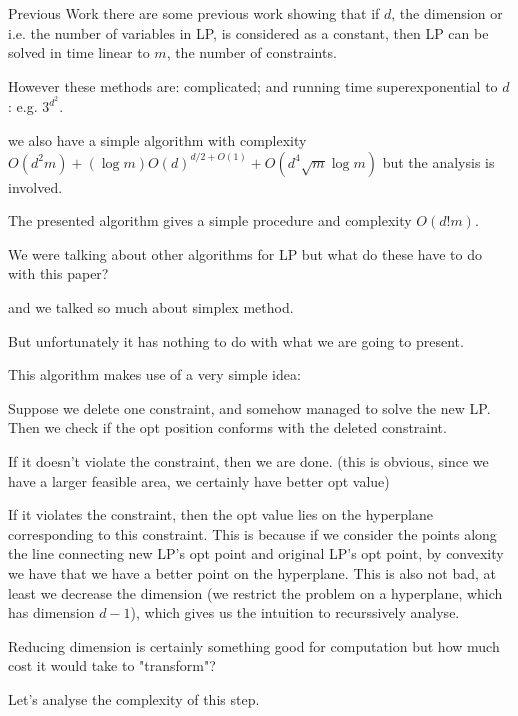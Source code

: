 \documentclass{beamer}
\begin{document}
\begin{frame}{Previous Work}
	there are some previous work showing that
	if $d$, the dimension or i.e. the number of variables in LP, is considered as a constant,
	then LP can be solved in time linear to $m$, the number of constraints.

	However these methods are: complicated; and running time superexponential to $d$: e.g. $3^{d^2}$.

	we also have a simple algorithm with complexity $O(d^2m) + (\log m)O(d)^{d/2 + O(1)} + O(d^4 \sqrt{m} \log m)$
	but the analysis is involved.

	The presented algorithm gives a simple procedure and complexity $O(d!m)$.

\end{frame}

\begin{frame}
	We were talking about other algorithms for LP but what do these have to do with this paper?

	and we talked so much about simplex method.

	But unfortunately it has nothing to do with what we are going to present.

	This algorithm makes use of a very simple idea:

	Suppose we delete one constraint, and somehow managed to solve the new LP.
	Then we check if the opt position conforms with the deleted constraint.

	If it doesn't violate the constraint, then we are done. (this is obvious,
	since we have a larger feasible area, we certainly have better opt value)

	If it violates the constraint, then the opt value lies on the hyperplane
	corresponding to this constraint.
	This is because if we consider the points along the line connecting
	new LP's opt point and original LP's opt point, by convexity we have that
	we have a better point on the hyperplane.
	This is also not bad, at least we decrease the dimension (we restrict the problem
	on a hyperplane, which has dimension $d - 1$), which gives us the intuition to recurssively analyse.

	Reducing dimension is certainly something good for computation but how much cost it would take to "transform"?

	Let's analyse the complexity of this step.

\end{frame}
\end{document}
